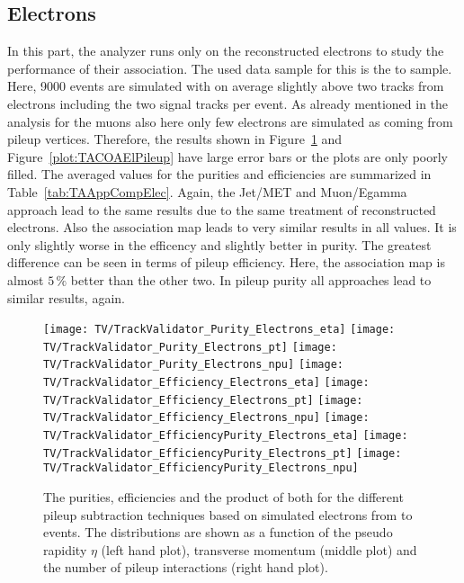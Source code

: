 

\clearpage{}

\subsection{Electrons \label{sec:TASEFRDAE} }

In this part, the analyzer runs only on the reconstructed electrons to study the performance of their association. The used data sample for this is the \Zz to \EE sample. Here, 9000 events are simulated with on average slightly above two tracks from electrons including the two signal tracks per event. As already mentioned in the analysis for the muons also here only few electrons are simulated as coming from pileup vertices. Therefore, the results shown in Figure~\ref{plot:TACOAElSignal} and Figure~\ref{plot:TACOAElPileup} have large error bars or the plots are only poorly filled. The averaged values for the purities and efficiencies are summarized in Table~\ref{tab:TAAppCompElec}. Again, the Jet/MET and Muon/Egamma approach lead to the same results due to the same treatment of reconstructed electrons. Also the association map leads to very similar results in all values. It is only slightly worse in the efficency and slightly better in purity. The greatest difference can be seen in terms of pileup efficiency. Here, the association map is almost $5\,\%$ better than the other two. In pileup purity all approaches lead to similar results, again.

\begin{figure}[h!t]
  \centering
  \texttt{[image: TV/TrackValidator\_Purity\_Electrons\_eta]}
  \texttt{[image: TV/TrackValidator\_Purity\_Electrons\_pt]}
  \texttt{[image: TV/TrackValidator\_Purity\_Electrons\_npu]}
  \newline
  \texttt{[image: TV/TrackValidator\_Efficiency\_Electrons\_eta]}
  \texttt{[image: TV/TrackValidator\_Efficiency\_Electrons\_pt]}
  \texttt{[image: TV/TrackValidator\_Efficiency\_Electrons\_npu]}
  \newline
  \texttt{[image: TV/TrackValidator\_EfficiencyPurity\_Electrons\_eta]}
  \texttt{[image: TV/TrackValidator\_EfficiencyPurity\_Electrons\_pt]}
  \texttt{[image: TV/TrackValidator\_EfficiencyPurity\_Electrons\_npu]}
  \caption[Purity, efficiency and their product for the different pileup subtraction techniques based on simulated electrons from \Zz to \EE events]{The purities, efficiencies and the product of both for the different pileup subtraction techniques based on simulated electrons from \Zz to \EE events. The distributions are shown as a function of the pseudo rapidity $\eta$ (left hand plot), transverse momentum (middle plot) and the number of pileup interactions (right hand plot). \label{plot:TACOAElSignal}}
\end{figure}

